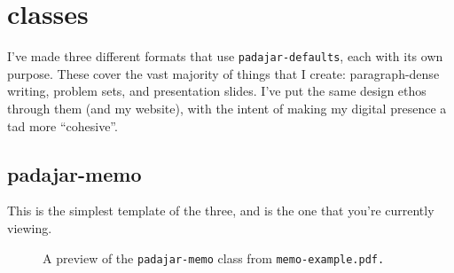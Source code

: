\documentclass[11pt]{padajar-memo}
\begin{document}
\section{classes}

I've made three different formats that use \texttt{padajar-defaults}, each with its own purpose. These cover the vast majority of things that I create: paragraph-dense writing, problem sets, and presentation slides. I've put the same design ethos through them (and my website), with the intent of making my digital presence a tad more ``cohesive''.

\subsection{padajar-memo}
This is the simplest template of the three, and is the one that you're currently viewing.

\begin{figure}[ht]
	\caption{A preview of the \texttt{padajar-memo} class from \texttt{memo-example.pdf.}}
	\begin{center}
	\end{center}
\end{figure}
\end{document}
